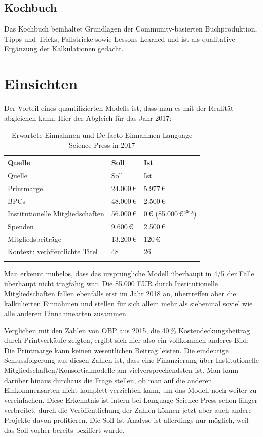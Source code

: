 \documentclass[a4paper,
fontsize=11pt,
oneside,
numbers=noperiodatend,
parskip=half-,
bibliography=totoc,
final
]{scrartcl}
\begin{document}
\hypertarget{kochbuch}{%
\subsection{Kochbuch}\label{kochbuch}}

Das Kochbuch beinhaltet Grundlagen der Community-basierten
Buchproduktion, Tipps und Tricks, Fallstricke sowie Lessons Learned und
ist als qualitative Ergänzung der Kalkulationen gedacht.

\hypertarget{einsichten}{%
\section{Einsichten}\label{einsichten}}

Der Vorteil eines quantifizierten Modells ist, dass man es mit der
Realität abgleichen kann. Hier der Abgleich für das Jahr 2017:

\pagebreak

\begin{longtable}[]{@{}lll@{}}
\toprule
Quelle & Soll & Ist\tabularnewline
\midrule
\endfirsthead
\toprule
Quelle & Soll & Ist\tabularnewline
\midrule
\endhead
Printmarge & 24.000\,€ & 5.977\,€\tabularnewline
BPCs & 48.000\,€ & 2.500\,€\tabularnewline
Institutionelle Mitgliedschaften & 56.000\,€ & 0\,€
(85.000\,€²⁰¹⁸)\tabularnewline
Spenden & 9.600\,€ & 2.500\,€\tabularnewline
Mitgliedsbeiträge & 13.200\,€ & 120\,€\tabularnewline
Kontext: veröffentlichte Titel & 48 & 26\tabularnewline
\bottomrule
\caption{Erwartete Einnahmen und De-facto-Einnahmen Language Science
Press in 2017}
\end{longtable}

Man erkennt mühelos, dass das ursprüngliche Modell überhaupt in 4/5 der
Fälle überhaupt nicht tragfähig war. Die 85.000 EUR durch
Institutionelle Mitgliedschaften fallen ebenfalls erst im Jahr 2018 an,
übertreffen aber die kalkulierten Einnahmen und stellen für sich allein
mehr als siebenmal soviel wie alle anderen Einnahmearten zusammen.

Verglichen mit den Zahlen von OBP aus 2015, die 40\,\%
Kostendeckungsbeitrag durch Printverkäufe zeigten, ergibt sich hier also
ein vollkommen anderes Bild: Die Printmarge kann keinen wesentlichen
Beitrag leisten. Die eindeutige Schlussfolgerung aus diesen Zahlen ist,
dass eine Finanzierung über Institutionelle
Mitgliedschaften/Konsortialmodelle am vielversprechendsten ist. Man kann
darüber hinaus durchaus die Frage stellen, ob man auf die anderen
Einkommensarten nicht komplett verzichten kann, um das Modell noch
weiter zu vereinfachen. Diese Erkenntnis ist intern bei Language Science
Press schon länger verbreitet, durch die Veröffentlichung der Zahlen
können jetzt aber auch andere Projekte davon profitieren. Die
Soll-Ist-Analyse ist allerdings nur möglich, weil das Soll vorher
bereits beziffert wurde.
\end{document}
